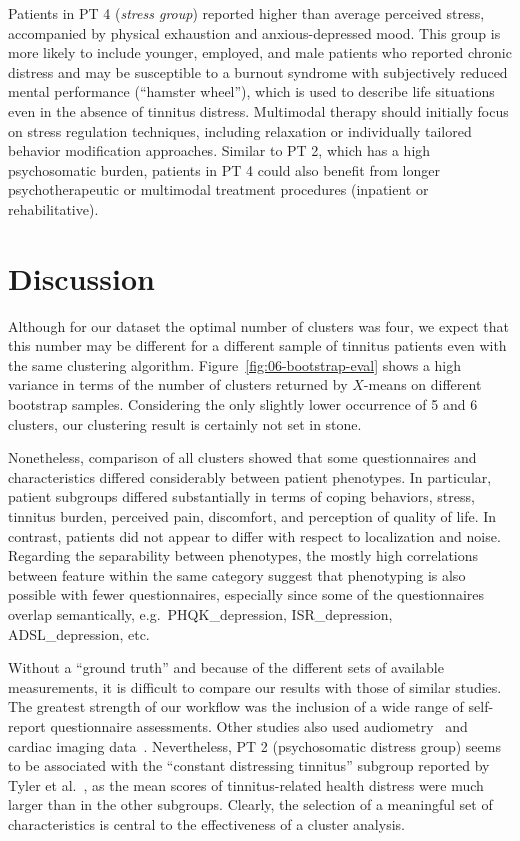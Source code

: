 \documentclass[
  oneside]{book}
\begin{document}
Patients in PT 4 (\emph{stress group}) reported higher than average perceived stress, accompanied by physical exhaustion and anxious-depressed mood.
This group is more likely to include younger, employed, and male patients who reported chronic distress and may be susceptible to a burnout syndrome with subjectively reduced mental performance (``hamster wheel''), which is used to describe life situations even in the absence of tinnitus distress.
Multimodal therapy should initially focus on stress regulation techniques, including relaxation or individually tailored behavior modification approaches.
Similar to PT 2, which has a high psychosomatic burden, patients in PT 4 could also benefit from longer psychotherapeutic or multimodal treatment procedures (inpatient or rehabilitative).

\hypertarget{phenotypes-discussion}{%
\section{Discussion}\label{phenotypes-discussion}}

Although for our dataset the optimal number of clusters was four, we expect that this number may be different for a different sample of tinnitus patients even with the same clustering algorithm.
Figure~\ref{fig:06-bootstrap-eval} shows a high variance in terms of the number of clusters returned by \(X\)-means on different bootstrap samples.
Considering the only slightly lower occurrence of 5 and 6 clusters, our clustering result is certainly not set in stone.

Nonetheless, comparison of all clusters showed that some questionnaires and characteristics differed considerably between patient phenotypes.
In particular, patient subgroups differed substantially in terms of coping behaviors, stress, tinnitus burden, perceived pain, discomfort, and perception of quality of life.
In contrast, patients did not appear to differ with respect to localization and noise.
Regarding the separability between phenotypes, the mostly high correlations between feature within the same category suggest that phenotyping is also possible with fewer questionnaires, especially since some of the questionnaires overlap semantically, e.g.~PHQK\_depression, ISR\_depression, ADSL\_depression, etc.

Without a ``ground truth'' and because of the different sets of available measurements, it is difficult to compare our results with those of similar studies.
The greatest strength of our workflow was the inclusion of a wide range of self-report questionnaire assessments.
Other studies also used audiometry~\autocite{Tyler:TinnitusClustering2008,Langguth:LCA2017} and cardiac imaging data~\autocite{Schecklmann:BrainResearch2012}.
Nevertheless, PT 2 (psychosomatic distress group) seems to be associated with the ``constant distressing tinnitus'' subgroup reported by Tyler et al.~\autocite{Tyler:TinnitusClustering2008}, as the mean scores of tinnitus-related health distress were much larger than in the other subgroups.
Clearly, the selection of a meaningful set of characteristics is central to the effectiveness of a cluster analysis.
\end{document}
